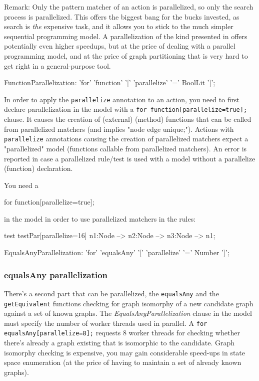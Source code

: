 Remark: Only the pattern matcher of an action is parallelized, so only the search process is parallelized.
This offers the biggest bang for the bucks invested, as search is \emph{the} expensive task, and it allows you to stick to the much simpler sequential programming model.
A parallelization of the kind presented in \cite{ParGraErs} offers potentially even higher speedups, but at the price of dealing with a parallel programming model, and at the price of graph partitioning that is very hard to get right in a general-purpose tool.

\begin{rail}
  FunctionParallelization: 'for' 'function' '[' 'parallelize' '=' BoolLit ']';
\end{rail}

In order to apply the \texttt{parallelize} annotation to an action, you need to first declare parallelization in the model with a \verb#for function[parallelize=true];# clause.
It causes the creation of (external) (method) functions that can be called from parallelized matchers (and implies "node edge unique;").
Actions with \texttt{parallelize} annotations causing the creation of parallelized matchers expect a "parallelized" model (functions callable from parallelized matchers).
An error is reported in case a parallelized rule/test is used with a model without a parallelize (function) declaration.

\begin{example}
You need a
\begin{grgen}
for function[parallelize=true];
\end{grgen}
in the model in order to use parallelized matchers in the rules:
\begin{grgen}
test testPar[parallelize=16]
{
	n1:Node --> n2:Node --> n3:Node --> n1;
}
\end{grgen}
\end{example}

\begin{rail}
  EqualsAnyParallelization: 'for' 'equalsAny' '[' 'parallelize' '=' Number ']';
\end{rail}


\subsubsection*{equalsAny parallelization}

There's a second part that can be parallelized, the \texttt{equalsAny} and the \texttt{getEquivalent} functions checking for graph isomorphy of a new candidate graph against a set of known graphs.
The \emph{EqualsAnyParallelization} clause in the model must specify the number of worker threads used in parallel.
A \verb#for equalsAny[parallelize=8];# requests 8 worker threads for checking whether there's already a graph existing that is isomorphic to the candidate.
Graph isomorphy checking is expensive, you may gain considerable speed-ups in state space enumeration (at the price of having to maintain a set of already known graphs).

